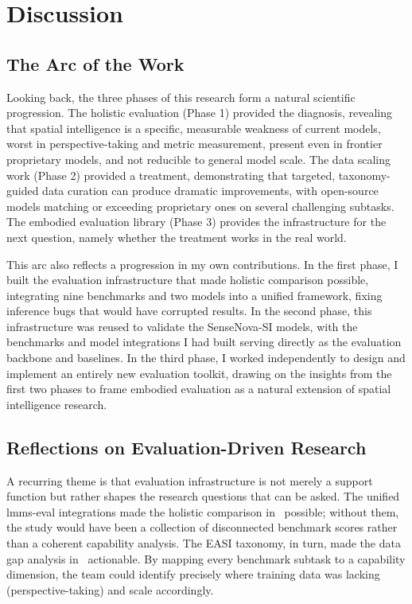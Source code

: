 \chapter{Discussion}
\label{sec:discussion}

\section{The Arc of the Work}

Looking back, the three phases of this research form a natural scientific progression. The holistic evaluation (Phase 1) provided the diagnosis, revealing that spatial intelligence is a specific, measurable weakness of current models, worst in perspective-taking and metric measurement, present even in frontier proprietary models, and not reducible to general model scale. The data scaling work (Phase 2) provided a treatment, demonstrating that targeted, taxonomy-guided data curation can produce dramatic improvements, with open-source models matching or exceeding proprietary ones on several challenging subtasks. The embodied evaluation library (Phase 3) provides the infrastructure for the next question, namely whether the treatment works in the real world.

This arc also reflects a progression in my own contributions. In the first phase, I built the evaluation infrastructure that made holistic comparison possible, integrating nine benchmarks and two models into a unified framework, fixing inference bugs that would have corrupted results. In the second phase, this infrastructure was reused to validate the SenseNova-SI models, with the benchmarks and model integrations I had built serving directly as the evaluation backbone and baselines. In the third phase, I worked independently to design and implement an entirely new evaluation toolkit, drawing on the insights from the first two phases to frame embodied evaluation as a natural extension of spatial intelligence research.

\section{Reflections on Evaluation-Driven Research}

A recurring theme is that evaluation infrastructure is not merely a support function but rather shapes the research questions that can be asked. The unified lmms-eval integrations made the holistic comparison in~\cite{cai2025holisticevaluationmultimodalllms} possible; without them, the study would have been a collection of disconnected benchmark scores rather than a coherent capability analysis. The EASI taxonomy, in turn, made the data gap analysis in~\cite{cai2025scalingspatialintelligencemultimodal} actionable. By mapping every benchmark subtask to a capability dimension, the team could identify precisely where training data was lacking (perspective-taking) and scale accordingly.

